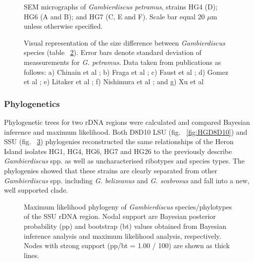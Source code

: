 \documentclass[12pt]{article}
\begin{document}
\begin{figure} 
\caption{SEM micrographs of \emph{Gambierdiscus petramus}, strains HG4 (D); HG6 (A and B); and HG7 (C, E and F). Scale bar equal 20 $\mu$m unless otherwise specified.} 
\label{fig:PetSEM}
\end{figure} 
\FloatBarrier 


\FloatBarrier 
\begin{figure} 
\caption{Visual representation of the size difference between \emph{Gambierdiscus} species (table ~\ref{fig:SizeGraph}). Error bars denote standard deviation of meassurements for \emph{G. petramus}. Data taken from publications as follows: a) Chinain et al \cite{chinain1999morphology}; b) Fraga et al \cite{fraga2014genus}; c) Faust et al \cite{faust1995observation}; d) Gomez et al \cite{gomez2015fukuyoa}; e) Litaker et al \cite{litaker2009taxonomy}; f) Nishimura et al \cite{nishimura2014morphology}; and g) Xu et al \cite{xu2014distribution}} 
\label{fig:SizeGraph}
\end{figure} 
\FloatBarrier 

\subsubsection{Phylogenetics}

Phylogenetic trees for two rDNA regions were calculated and compared Bayesian inference and maximum likelihood. Both D8D10 LSU (fig. ~\ref{fig:HGD8D10}) and SSU (fig. ~\ref{fig:HGSSU}) phylogenies reconstructed the same relationships of the Heron Island isolates HG1, HG4, HG6, HG7 and HG26 to the previously describe \emph{Gambierdiscus} spp. as well as uncharacterised ribotypes and species types. The phylogenies showed that these strains are clearly separated from other \emph{Gambierdiscus} spp. including \emph{G. belizeanus} and \emph{G. scabrosus} and fall into a new, well supported clade.\\

\FloatBarrier 

\begin{figure} 
\caption{Maximum likelihood phylogeny of \textit{Gambierdiscus} species/phylotypes of the SSU rDNA region. Nodal support are Bayesian posterior probability (pp) and bootstrap (bt) values obtained from Bayesian inference analysis and maximum likelihood analysis, respectively. Nodes with strong support (pp/bt = 1.00 / 100) are shown as thick lines.}
\label{fig:HGSSU} 
\end{figure} 
\FloatBarrier 
\end{document}
